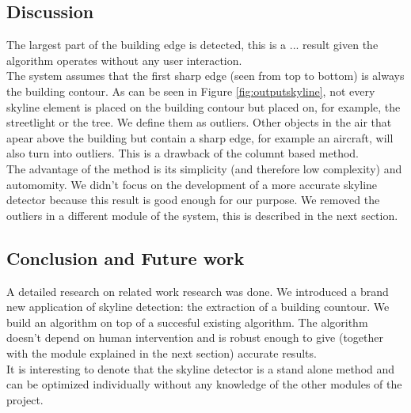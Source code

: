 \subsection{Discussion}  %
The largest part of the building edge is detected, this is a ...
result given
the algorithm operates without any user interaction.\\
The system assumes that the first sharp edge (seen from top to bottom) is always
the building contour. As can be seen in Figure \ref{fig:outputskyline}, not
every skyline element is placed on the building contour but placed on, for
example, the streetlight or the tree. We define them as outliers.
Other objects in the air that apear above the building but contain a sharp edge,
for example an aircraft, will also turn into outliers.  This is a drawback of the
	columnt based method.\\
The advantage of the method is its simplicity (and therefore low complexity) and
automomity.  We didn't focus on the development of a more accurate skyline
detector because this result is good enough for our purpose. We removed the
outliers in a different module of the system, this is described in the next
section.  








\subsection{Conclusion and Future work}
A detailed research on related work research was done.
We introduced a brand new application of skyline detection: the extraction of a
building countour. We build an algorithm on top of a succesful existing
algorithm.  The algorithm doesn't depend on human intervention and is robust enough to give
(together with the module explained in the next section) accurate results.\\
It is interesting to denote that the skyline detector is a stand alone method and
can be optimized individually without any knowledge of the other modules of the
project.\\

